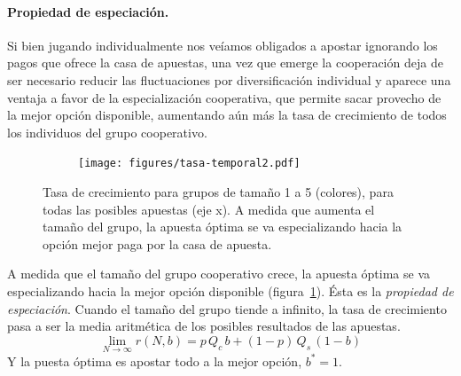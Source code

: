 \documentclass[a4paper,11pt]{book}
\theoremstyle{definition}
\begin{document}
\paragraph{Propiedad de especiación.}
Si bien jugando individualmente nos veíamos obligados a apostar ignorando los pagos que ofrece la casa de apuestas, una vez que emerge la cooperación deja de ser necesario reducir las fluctuaciones por diversificación individual y aparece una ventaja a favor de la especialización cooperativa, que permite sacar provecho de la mejor opción disponible, aumentando aún más la tasa de crecimiento de todos los individuos del grupo cooperativo.
%
\begin{figure}[ht!]
\centering
  \begin{subfigure}[c]{0.45\textwidth}
\begin{flushright}
 \texttt{[image: figures/tasa-temporal2.pdf]}
 \end{flushright}
 \end{subfigure}
 \caption{
Tasa de crecimiento para grupos de tamaño 1 a 5 (colores), para todas las posibles apuestas (eje x). A medida que aumenta el tamaño del grupo, la apuesta óptima se va especializando hacia la opción mejor paga por la casa de apuesta.
 }
 \label{fig:esp}
 \vspace{-0.1cm}
 \end{figure}
%
A medida que el tamaño del grupo cooperativo crece, la apuesta óptima se va especializando hacia la mejor opción disponible (figura~\ref{fig:esp}).
%
Ésta es la \emph{propiedad de especiación}.
%
Cuando el tamaño del grupo tiende a infinito, la tasa de crecimiento pasa a ser la media aritmética de los posibles resultados de las apuestas.
%
\begin{equation}
\lim_{N \rightarrow \infty} r(N,b) = p \,  Q_c  \, b + (1-p) \, Q_s  \, (1-b)
\end{equation}
%
Y la puesta óptima es apostar todo a la mejor opción, $b^* =1$.

\end{document}
